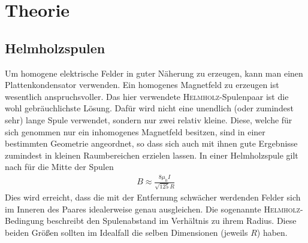 \documentclass[12pt,a4paper,titlepage,headinclude,bibtotoc]{scrartcl}
\numberwithin{equation}{section}
\begin{document}
\section{Theorie}
\label{sec:theorie}


\subsection{Helmholzspulen}
Um homogene elektrische Felder in guter Näherung zu erzeugen, kann man einen Plattenkondensator verwenden.
Ein homogenes Magnetfeld zu erzeugen ist wesentlich anspruchsvoller. 
Das hier verwendete \textsc{Helmholz}-Spulenpaar ist die wohl gebräuchlichste Lösung.
Dafür wird nicht eine unendlich (oder zumindest sehr) lange Spule verwendet, sondern nur zwei relativ kleine.
Diese, welche für sich genommen nur ein inhomogenes Magnetfeld besitzen, sind in einer bestimmten Geometrie angeordnet, so dass sich auch mit ihnen gute Ergebnisse zumindest in kleinen Raumbereichen erzielen lassen.
In einer Helmholzspule gilt nach \cite[S. 94, Gleichung 3.22c]{demtroeder2} für die Mitte der Spulen
\begin{align}
	B\approx\frac{8\mu_0I}{\sqrt{125}R}\label{eq:BHelm}
\end{align}
Dies wird erreicht, dass die mit der Entfernung schwächer werdenden Felder sich im Inneren des Paares idealerweise genau ausgleichen.
Die sogenannte \textsc{Helmholz}-Bedingung beschreibt den Spulenabstand im Verhältnis zu ihrem Radius.
Diese beiden Größen sollten im Idealfall die selben Dimensionen (jeweils $R$) haben.\\
\end{document}
